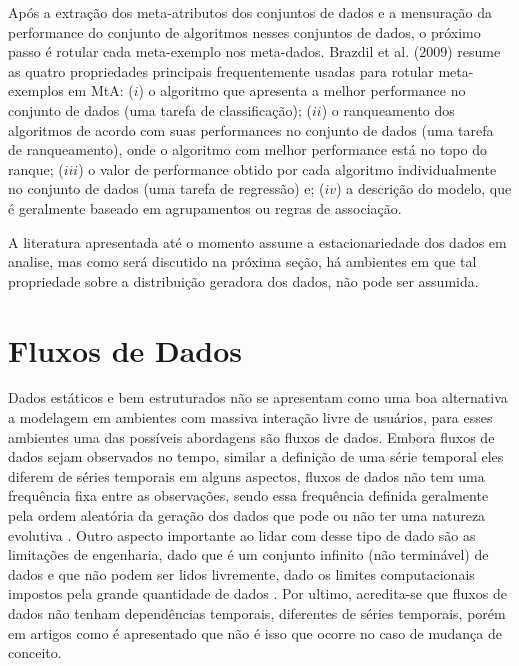 Após a extração dos meta-atributos dos conjuntos de dados e a mensuração da performance do conjunto de algoritmos nesses conjuntos de dados, o próximo passo é rotular cada meta-exemplo nos meta-dados. 
Brazdil et al. (2009) \cite{Brazdil2009} resume as quatro propriedades principais frequentemente usadas para rotular meta-exemplos em MtA: ($i$)
o algoritmo que apresenta a melhor performance no conjunto de dados (uma tarefa de classificação); ($ii$) o ranqueamento dos algoritmos de acordo com suas performances no conjunto de dados (uma tarefa de ranqueamento), onde o algoritmo com melhor performance está no topo do ranque; ($iii$) o valor de performance obtido por cada algoritmo individualmente no conjunto de dados (uma tarefa de regressão) e; ($iv$) a descrição do modelo, que é geralmente baseado em agrupamentos ou regras de associação.

A literatura apresentada até o momento assume a estacionariedade dos dados em analise, mas como será discutido na próxima seção, há ambientes em que tal propriedade sobre a distribuição geradora dos dados, não pode ser assumida.

\section{Fluxos de Dados}

\label{sec:datastreams}
Dados estáticos e bem estruturados não se apresentam como uma boa alternativa a modelagem em ambientes com massiva interação livre de usuários, para esses ambientes uma das possíveis abordagens são fluxos de dados\cite{babcock2002models}.
Embora fluxos de dados sejam observados no tempo, similar a definição de uma série temporal eles diferem de séries temporais em alguns aspectos, fluxos de dados não tem uma frequência fixa entre as observações, sendo essa frequência definida geralmente pela ordem aleatória da geração dos dados que pode ou não ter uma natureza evolutiva  \cite{gama2007learning}. Outro aspecto importante ao lidar com desse tipo de dado são as limitações de engenharia, dado que é um conjunto infinito (não terminável) de dados e que não podem ser lidos livremente, dado os limites computacionais impostos pela grande quantidade de dados \cite{babcock2002models}. Por ultimo, acredita-se que fluxos de dados não tenham dependências temporais, diferentes de séries temporais, porém em artigos como \cite{read2018concept} é apresentado que não é isso que ocorre no caso de mudança de conceito.

